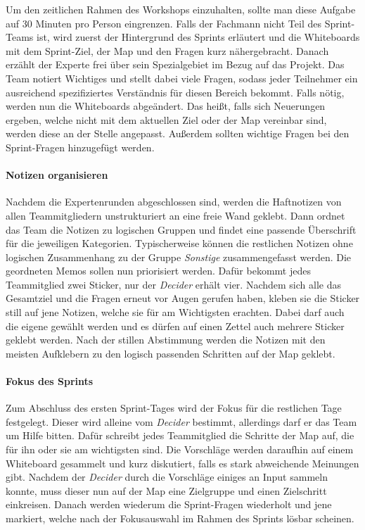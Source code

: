 Um den zeitlichen Rahmen des Workshops einzuhalten, sollte man diese Aufgabe auf 30 Minuten pro Person eingrenzen. Falls der Fachmann nicht Teil des Sprint-Teams ist, wird zuerst der Hintergrund des Sprints erläutert und die Whiteboards mit dem Sprint-Ziel, der Map und den Fragen kurz nähergebracht. Danach erzählt der Experte frei über sein Spezialgebiet im Bezug auf das Projekt. Das Team notiert Wichtiges und stellt dabei viele Fragen, sodass jeder Teilnehmer ein ausreichend spezifiziertes Verständnis für diesen Bereich bekommt. Falls nötig, werden nun die Whiteboards abgeändert. Das heißt, falls sich Neuerungen ergeben, welche nicht mit dem aktuellen Ziel oder der Map vereinbar sind, werden diese an der Stelle angepasst. Außerdem sollten wichtige Fragen bei den Sprint-Fragen hinzugefügt werden.

\paragraph{Notizen organisieren}
\label{sec:Sprint-Tag1-Notizen}
Nachdem die Expertenrunden abgeschlossen sind, werden die Haftnotizen von allen Teammitgliedern unstrukturiert an eine freie Wand geklebt. Dann ordnet das Team die Notizen zu logischen Gruppen und findet eine passende Überschrift für die jeweiligen Kategorien. Typischerweise können die restlichen Notizen ohne logischen Zusammenhang zu der Gruppe \textit{Sonstige} zusammengefasst werden.
Die geordneten Memos sollen nun priorisiert werden. Dafür bekommt jedes Teammitglied zwei Sticker, nur der \textit{Decider} erhält vier. Nachdem sich alle das Gesamtziel und die Fragen erneut vor Augen gerufen haben, kleben sie die Sticker still auf jene Notizen, welche sie für am Wichtigsten erachten. Dabei darf auch die eigene gewählt werden und es dürfen auf einen Zettel auch mehrere Sticker geklebt werden. Nach der stillen Abstimmung werden die Notizen mit den meisten Aufklebern zu den logisch passenden Schritten auf der Map geklebt.

\paragraph{Fokus des Sprints}
\label{sec:Sprint-Tag1-Fokus}
Zum Abschluss des ersten Sprint-Tages wird der Fokus für die restlichen Tage festgelegt. Dieser wird alleine vom \textit{Decider} bestimmt, allerdings darf er das Team um Hilfe bitten. Dafür schreibt jedes Teammitglied die Schritte der Map auf, die für ihn oder sie am wichtigsten sind. Die Vorschläge werden daraufhin auf einem Whiteboard gesammelt und kurz diskutiert, falls es stark abweichende Meinungen gibt. Nachdem der \textit{Decider} durch die Vorschläge einiges an Input sammeln konnte, muss dieser nun auf der Map eine Zielgruppe und einen Zielschritt einkreisen. Danach werden wiederum die Sprint-Fragen wiederholt und jene markiert, welche nach der Fokusauswahl im Rahmen des Sprints lösbar scheinen.

